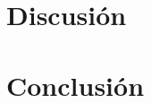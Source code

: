 \documentclass[12pt]{article}
\begin{document}
\section{Discusión}

\section{Conclusión}
\end{document}

